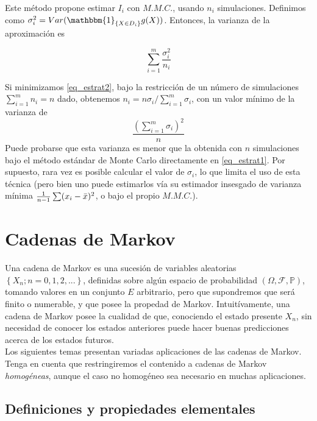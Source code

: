 \documentclass[a4paper]{article}
\newcommand{\prob}{\mathbb{P}}
\numberwithin{equation}{subsection}
\numberwithin{definicion}{subsection}
\begin{document}
Este método propone estimar $I_i$ con $M.M.C.$, usando $n_i$ simulaciones. Definimos como $\sigma_i^2 = Var(\mathbbm{1}_{\{X\in D_i\}}g(X))$. Entonces, la varianza de la aproximación es

\begin{equation}
    \sum_{i=1}^m \frac{\sigma_i^2}{n_i}
    \label{eq_estrat2}
\end{equation}

Si minimizamos \ref{eq_estrat2}, bajo la restricción de un número de simulaciones $\sum_{i=1}^m n_i = n$ dado, obtenemos $n_i =n\sigma_i/\sum_{i=1}^m\sigma_i$, con un valor mínimo de la varianza de
\[\frac{\left(\sum_{i=1}^m \sigma_i\right)^2}{n}\]
Puede probarse que esta varianza es menor que la obtenida con $n$ simulaciones bajo el método estándar de Monte Carlo directamente en \ref{eq_estrat1}. Por supuesto, rara vez es posible calcular el valor de $\sigma_i$, lo que limita el uso de esta técnica (pero bien uno puede estimarlos vía su estimador insesgado de varianza mínima $\frac{1}{n-1}\sum (x_i-\Bar{x})^2$, o bajo el propio $M.M.C.$).

\section{Cadenas de Markov}
Una cadena de Markov es una sucesión de variables aleatorias $\left\{X_n;n=0,1,2,...\right\}$, definidas sobre algún espacio de probabilidad $\left(\Omega,\mathcal{
F}, \prob\right)$, tomando valores en un conjunto $E$ arbitrario, pero que supondremos que será finito o numerable, y que posee la propedad de Markov. Intuitívamente, una cadena de Markov posee la cualidad de que, conociendo el estado presente $X_n$, sin necesidad de conocer los estados anteriores puede hacer buenas predicciones acerca de los estados futuros.\\ Los siguientes temas presentan variadas aplicaciones de las cadenas de Markov. Tenga en cuenta que restringiremos el contenido a cadenas de Markov \textit{homogéneas}, aunque el caso no homogéneo sea necesario en muchas aplicaciones.

\subsection{Definiciones y propiedades elementales}
\end{document}
